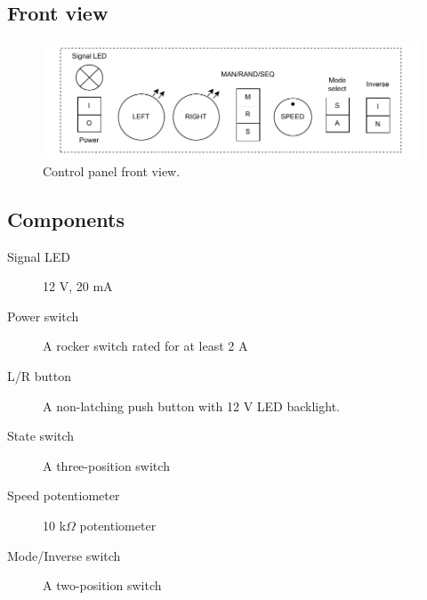 \subsection{Front view}
\begin{figure}[h!]
    \centering
    \includegraphics[width=\textwidth]{images/siteshift_frontview.drawio.pdf}
    \caption{Control panel front view.}
    \label{fig:control_panel}
\end{figure}

\subsection{Components}
\begin{description}
    \item[Signal LED] 12 V, 20 mA
    \item[Power switch] A rocker switch rated for at least 2 A
    \item[L/R button] A non-latching push button with 12 V LED backlight.
    \item[State switch] A three-position switch
    \item[Speed potentiometer] 10 k$\Omega$ potentiometer
    \item[Mode/Inverse switch] A two-position switch
\end{description}

